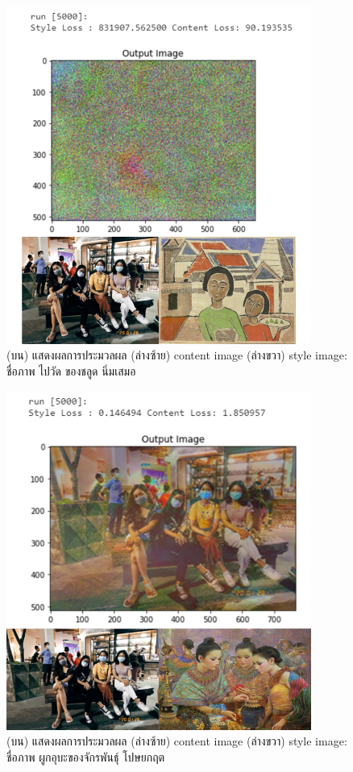 \documentclass[12pt,oneside,openright,a4paper]{cpe-thai-project}
\begin{document}
\begin{figure}[!h]
  \centering
  \includegraphics[width=10cm]{./image/result1.png}
  \caption{(บน) แสดงผลการประมวลผล (ล่างซ้าย) content image (ล่างขวา) style image: ชื่อภาพ ไปวัด ของชลูด นิ่มเสมอ}
  \label{fig:result1}
\end{figure}

\newpage
\begin{figure}[!h]
  \centering
  \includegraphics[width=10cm]{./image/result2.png}
  \caption{(บน) แสดงผลการประมวลผล (ล่างซ้าย) content image (ล่างขวา) style image: ชื่อภาพ ผูกอุบะของจักรพันธุ์ โปษยกฤต}
  \label{fig:django2}
\end{figure}
\end{document}
